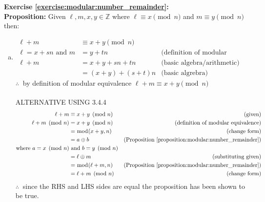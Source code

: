 \noindent\textbf{Exercise \ref{exercise:modular:number_remainder}:}\\ %
\textbf{Proposition:} Given $\ell, m, x, y \in {\mathbb Z}$ where $\ell \equiv x\pmod{n}$ and $m \equiv y \pmod{n}$ then:\\
\begin{enumerate}[(a)]
\item 
\begin{align*} 
\ell + m &\equiv x + y\pmod{n}\\
\ell = x + sn \text{\ and\ } m &= y + tn  &\text{(definition of modular equivalence)}\\
\ell + m &= x + y + sn + tn &\text{(basic algebra/arithmetic)}\\
&=(x + y) + (s + t)n &\text{(basic algrebra)}
\end{align*}
$\therefore\ $ by definition of modular equivalence $\ell + m \equiv x + y \pmod{n}$\\
\\
ALTERNATIVE USING 3.4.4
\begin{align*} 
\ell + m &\equiv x + y\pmod{n} &\text{(given)}\\
\ell + m \pmod{n} &= x + y\pmod{n}  &\text{(definition of modular equivalence)}\\
&= \bmod(x + y, n)  &\text{(change form)}\\
&= a \oplus b &\text{(Proposition~\ref{proposition:modular:number_remainder})}\\
\text{where\ } a = x\pmod{n} &\text{\ and\ } b = y\pmod{n}\\
&= \ell \oplus m &\text{(substituting given)}\\
&= \bmod(\ell + m, n) &\text{(Proposition~\ref{proposition:modular:number_remainder})}\\
&= \ell + m\pmod{n} &\text{(change form)}
\end{align*}
$\therefore\ $ since the RHS and LHS sides are equal the proposition has been shown to be true.


\end{enumerate}
